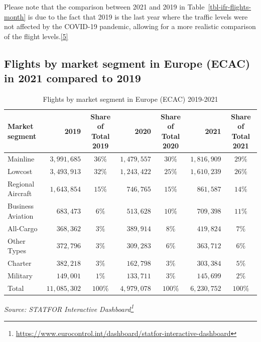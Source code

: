 \documentclass[
  11pt,
  a4paper,
]{book}
\DeclareRobustCommand{\href}[2]{#2\footnote{\url{#1}}}
\begin{document}
Please note that the comparison between 2021 and 2019 in
Table~\ref{tbl-ifr-flights-month} is due to the fact that 2019 is the
last year where the traffic levels were not affected by the COVID-19
pandemic, allowing for a more realistic comparison of the flight
levels.\protect\hyperlink{ref-ectrl:statfor:sid}{{[}5{]}}

\hypertarget{flights-by-market-segment-in-europe-ecac-in-2021-compared-to-2019}{%
\subsection{Flights by market segment in Europe (ECAC) in 2021 compared
to
2019}\label{flights-by-market-segment-in-europe-ecac-in-2021-compared-to-2019}}

\hypertarget{tbl-flights-per-market-segment}{}
\setlength{\LTpost}{0mm}
\begin{longtable}{lrcrcrc}
\caption{\label{tbl-flights-per-market-segment}Flights by market segment in Europe (ECAC) 2019-2021 }\tabularnewline

\toprule
Market segment & 2019 & Share of Total 2019 & 2020 & Share of Total 2020 & 2021 & Share of Total 2021 \\ 
\midrule
Mainline & $3,991,685$ & $36\%$ & $1,479,557$ & $30\%$ & $1,816,909$ & $29\%$ \\ 
Lowcost & $3,493,913$ & $32\%$ & $1,243,422$ & $25\%$ & $1,610,239$ & $26\%$ \\ 
Regional Aircraft & $1,643,854$ & $15\%$ & $746,765$ & $15\%$ & $861,587$ & $14\%$ \\ 
Business Aviation & $683,473$ & $6\%$ & $513,628$ & $10\%$ & $709,398$ & $11\%$ \\ 
All-Cargo & $368,362$ & $3\%$ & $389,914$ & $8\%$ & $419,824$ & $7\%$ \\ 
Other Types & $372,796$ & $3\%$ & $309,283$ & $6\%$ & $363,712$ & $6\%$ \\ 
Charter & $382,218$ & $3\%$ & $162,798$ & $3\%$ & $303,384$ & $5\%$ \\ 
Military & $149,001$ & $1\%$ & $133,711$ & $3\%$ & $145,699$ & $2\%$ \\ 
Total & $11,085,302$ & $100\%$ & $4,979,078$ & $100\%$ & $6,230,752$ & $100\%$ \\ 
\bottomrule
\end{longtable}
\begin{minipage}{\linewidth}
\emph{Source: \href{https://www.eurocontrol.int/dashboard/statfor-interactive-dashboard}{STATFOR Interactive Dashboard}}\\
\end{minipage}
\end{document}
